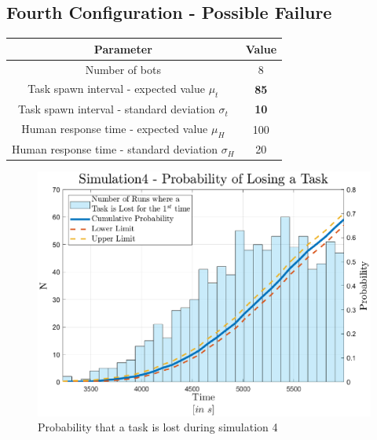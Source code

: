\documentclass{article}
\begin{document}
		\subsection{Fourth Configuration - Possible Failure}
			\begin{center}
				\begin{tabular}{ |c|c|}
					\hline
					Parameter & Value\\
					\hline
					\hline
					Number of bots & 8\\
					\hline
					Task spawn interval - expected value $\mu_t$ & \textbf{85}\\
					\hline					
					Task spawn interval - standard deviation $\sigma_t$ & \textbf{10}\\
					\hline
					Human response time - expected value $\mu_H$ & 100\\
					\hline					
					Human response time - standard deviation $\sigma_H$ & 20\\
					\hline
				\end{tabular}
			\end{center}
			\begin{figure}[H]
				\centering
					\includegraphics[scale = 0.6]{Images/Simulation4}
					\caption{Probability that a task is lost during simulation 4}
					\label{fig:sim4}
			\end{figure}
	
\end{document}
